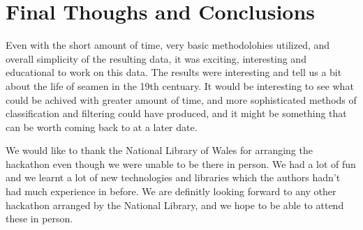 \documentclass{article}
\begin{document}
\section{Final Thoughs and Conclusions}

Even with the short amount of time, very basic methodolohies utilized, and overall simplicity of the resulting data, it was exciting, interesting and educational to work on this data. 
The results were interesting and tell us a bit about the life of seamen in the 19th centuary.
It would be interesting to see what could be achived with greater amount of time, and more sophisticated methods of classification and filtering could have produced, and it might be something that can be worth coming back to at a later date.

We would like to thank the National Library of Wales for arranging the hackathon even though we were unable to be there in person.
We had a lot of fun and we learnt a lot of new technologies and libraries which the authors hadn't had much experience in before.
We are definitly looking forward to any other hackathon arranged by the National Library, and we hope to be able to attend these in person.
\end{document}
